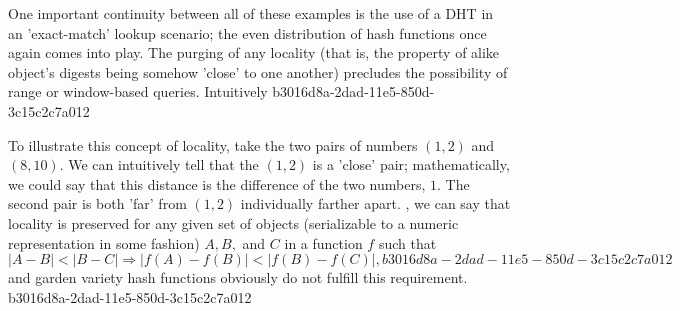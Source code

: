 \documentclass[12pt]{article}
\begin{document}
\par One important continuity between all of these examples is the use of a DHT in an 'exact-match' lookup scenario; the even distribution of hash functions once again comes into play. The purging of any locality (that is, the property of alike object's digests being somehow 'close' to one another) precludes the possibility of range or window-based queries. Intuitively
b3016d8a-2dad-11e5-850d-3c15c2c7a012
\par To illustrate this concept of locality, take the two pairs of numbers $(1,2)$ and $(8,10)$. We can intuitively tell that the $(1,2)$ is a 'close' pair; mathematically, we could say that this distance is the difference of the two numbers, $1$. The second pair is both 'far' from $(1,2)$ individually farther apart. , we can say that locality is preserved for any given set of objects (serializable to a numeric representation in some fashion) $A,B,$ and $C$ in a function $f$ such that
\begin{equation}
|A-B| < |B-C| \Rightarrow |f(A)-f(B)| < |f(B) - f(C)|,
b3016d8a-2dad-11e5-850d-3c15c2c7a012\end{equation}
and garden variety hash functions obviously do not fulfill this requirement.
b3016d8a-2dad-11e5-850d-3c15c2c7a012
\printbibliography
\end{document}
